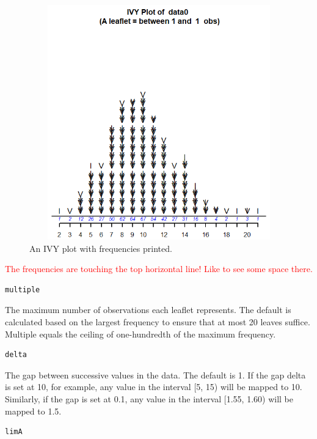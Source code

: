 \begin{Schunk}
\begin{figure}[htbp]

{\centering \includegraphics[width=5in,height=4in]{With_frequency} 

}

\caption[An IVY plot with frequencies printed]{An IVY plot with frequencies printed.}\label{fig:unnamed-chunk-2}
\end{figure}
\end{Schunk}

\textcolor{red}{The frequencies are touching the top horizontal line! Like  to see some space there.}

\begin{verbatim}
multiple
\end{verbatim}

The maximum number of observations each leaflet represents. The default
is calculated based on the largest frequency to ensure that at most 20
leaves suffice. Multiple equals the ceiling of one-hundredth of the
maximum frequency.

\begin{verbatim}
delta
\end{verbatim}

The gap between successive values in the data. The default is 1. If the
gap delta is set at 10, for example, any value in the interval {[}5, 15)
will be mapped to 10. Similarly, if the gap is set at 0.1, any value in
the interval {[}1.55, 1.60) will be mapped to 1.5.

\begin{verbatim}
limA
\end{verbatim}

